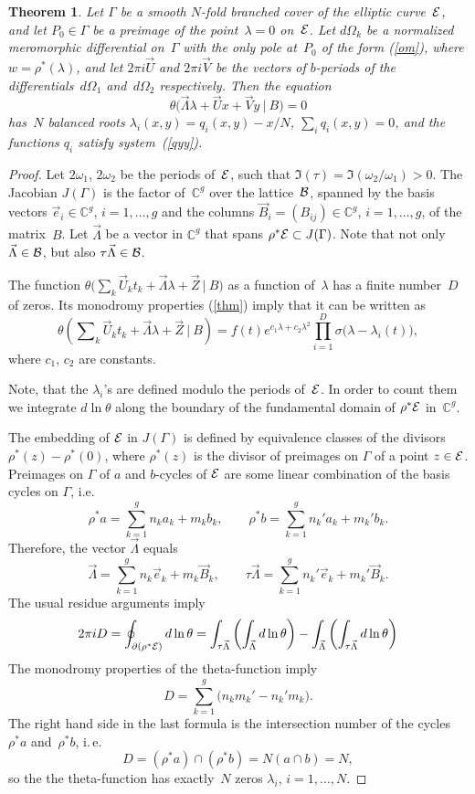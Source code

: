 \documentclass[a4paper,11pt]{article}
\newcommand{\p}{\partial}
\newcommand{\comp}{\mathbb C}
\newcommand{\cB}{{\cal B}}
\newcommand{\cE}{{\cal E}}
\newcommand{\vL}{\Vec{\Lambda}}
\newcommand{\vB}{\Vec{B}}
\newcommand{\vU}{\Vec{U}}
\newcommand{\vV}{\Vec{V}}
\newcommand{\vZ}{\Vec{Z}}
\theoremstyle{plain}
\newtheorem{teo}{Theorem}
\theoremstyle{remark}
\begin{document}
\begin{teo}
Let $\Gamma$ be a smooth $N$-fold branched cover of the elliptic
curve~$\cE$, and let $P_0\in\Gamma$ be a preimage of the point~$\lambda=0$
on~$\cE$. Let $d\Omega_k$ be a normalized meromorphic differential
on~$\Gamma$ with the only pole at~$P_0$ of the form \emph{(\ref{om})},
where $w=\rho^{*}(\lambda)$, and let $2\pi i \vU$ and $2\pi i \vV$ be the
vectors of $b$-periods of the differentials~$d\Omega_1$
and~$d\Omega_2$ respectively. Then the equation
\begin{equation}
\theta \bigl( \vL\lambda+\vU x+\vV y\ |\ B \bigr)=0
\end{equation}
has~$N$ balanced roots $\lambda_i(x,y)=q_i(x,y)-x/N$, $\sum_i q_i(x,y)=0$,
and the functions $q_i$ satisfy system~\emph{(\ref{qyy})}.
\end{teo}
\begin{proof}
Let $2\omega_1$, $2\omega_2$ be the  periods of~$\cE$,
such that $\Im(\tau)=\Im(\omega_2/\omega_1)>0$.
The Jacobian $J(\Gamma)$ is the factor of~$\comp^g$ over the lattice~$\cB$,
spanned by the basis vectors $\Vec{e}_i\in\comp^g$, $i=1,\dots,g$
and the columns $\vB_i=(B_{ij})\in\comp^g$, $i=1,\dots,g$, of the matrix~$B$.
Let $\vL$ be a vector in $\comp^g$ that spans $\rho^*\cE\subset J(\Gamma)$.
Note that not only $\vL\in\cB$, but also $\tau\vL\in\cB$.

The function
$\theta \bigl( \sum _k \vU_k t_k+\vL \lambda+\vZ\ |\ B\bigr)$
as a function of~$\lambda$ has a finite number~$D$ of zeros.
Its monodromy properties (\ref{thm}) imply that it can be written as
$$
\theta \left(\sum\nolimits_k \vU_k t_k +\vL\lambda+\vZ\ \bigr|\ B\right)=
f(t)e^{c_1\lambda+c_2\lambda^2}
\prod_{i=1}^D \sigma \bigl( \lambda-\lambda_i(t) \bigr) ,
$$
where $c_1$, $c_2$ are constants.

Note, that the $\lambda_i$'s are defined modulo the periods of~$\cE$.
In order to count them we integrate $d\ln \theta$ along the
boundary of the fundamental domain of $\rho^*\cE$ in~$\comp^g$.

The embedding of $\cE$ in $J(\Gamma)$ is defined by equivalence classes
of the divisors $\rho^*(z)-\rho^*(0)$, where $\rho^*(z)$ is the divisor of
preimages on $\Gamma$ of a point $z\in\cE$.
Preimages on $\Gamma$ of $a$ and $b$-cycles of $\cal E$ are some
linear combination of the basis cycles on $\Gamma$, i.e.
$$
\rho^* a=\sum_{k=1}^g n_ka_k + m_k b_k,\qquad
\rho^* b=\sum_{k=1}^g n_k'a_k+ m_k'b_k .
$$
Therefore, the vector $\vL$ equals
$$
\vL=\sum_{k=1}^g n_k \Vec{e}_k+m_k \vB_k,\qquad
\tau \vL=\sum_{k=1}^g n_k' \Vec{e}_k+m_k' \vB_k .
$$
The usual residue arguments imply
$$
2\pi i D=\oint_{\p (\rho^*\cE)} d\ln \theta=
\int_{\tau \vL}\left(\int_{\vL}d\ln\theta\right)-
\int_{\vL}\left(\int_{\tau \vL}d\ln\theta\right)
$$
The monodromy properties of the theta-function imply
$$
D=\sum_{k=1}^g \bigl( n_k m_k'-n_k' m_k \bigr).
$$
The right hand side in the last formula is the intersection number of
the cycles~$\rho^{*}a$ and~$\rho^{*}b$, i.\,e.
$$
D=(\rho^*a)\cap (\rho^*b)=N \left(a\cap b\right)=N,
$$
so the the theta-function has exactly~$N$ zeros $\lambda_i$, $i=1,\dots,N$.


\end{proof}
\end{document}
